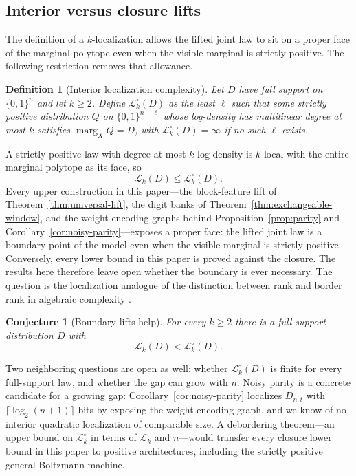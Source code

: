 \documentclass{article}
\newcommand{\LC}{\mathcal{L}}
\newcommand{\bits}{\{0,1\}}
\newtheorem{definition}{Definition}
\newtheorem{conjecture}{Conjecture}
\begin{document}
\subsection{Interior versus closure lifts}
\label{sec:interior-vs-closure}

The definition of a $k$-localization allows the lifted joint law to sit on a
proper face of the marginal polytope even when the visible marginal is
strictly positive.  The following restriction removes that allowance.

\begin{definition}[Interior localization complexity]\label{def:interior}
Let $D$ have full support on $\bits^n$ and let $k\ge2$.  Define
$\LC_k^{\circ}(D)$ as the least $\ell$ such that some strictly positive
distribution $Q$ on $\bits^{n+\ell}$ whose log-density has multilinear degree
at most $k$ satisfies $\operatorname{marg}_XQ=D$, with
$\LC_k^{\circ}(D)=\infty$ if no such $\ell$ exists.
\end{definition}

A strictly positive law with degree-at-most-$k$ log-density is $k$-local with
the entire marginal polytope as its face, so
\[
  \LC_k(D)\le\LC_k^{\circ}(D).
\]
Every upper construction in this paper---the block-feature lift of
Theorem~\ref{thm:universal-lift}, the digit banks of
Theorem~\ref{thm:exchangeable-window}, and the weight-encoding graphs behind
Proposition~\ref{prop:parity} and Corollary~\ref{cor:noisy-parity}---exposes a
proper face: the lifted joint law is a boundary point of the model even when
the visible marginal is strictly positive.  Conversely, every lower bound in
this paper is proved against the closure.  The results here therefore leave
open whether the boundary is ever necessary.  The question is the
localization analogue of the distinction between rank and border rank in
algebraic complexity \cite{bcs97}.

\begin{conjecture}[Boundary lifts help]\label{conj:interior}
For every $k\ge2$ there is a full-support distribution $D$ with
\[
  \LC_k(D)<\LC_k^{\circ}(D).
\]
\end{conjecture}

Two neighboring questions are open as well: whether $\LC_k^{\circ}(D)$ is
finite for every full-support law, and whether the gap can grow with $n$.
Noisy parity is a concrete candidate for a growing gap:
Corollary~\ref{cor:noisy-parity} localizes $D_{n,t}$ with
$\lceil\log_2(n+1)\rceil$ bits by exposing the weight-encoding graph, and we
know of no interior quadratic localization of comparable size.  A debordering
theorem---an upper bound on $\LC_k^{\circ}$ in terms of $\LC_k$ and
$n$---would transfer every closure lower bound in this paper to positive
architectures, including the strictly positive general Boltzmann machine.
\end{document}
